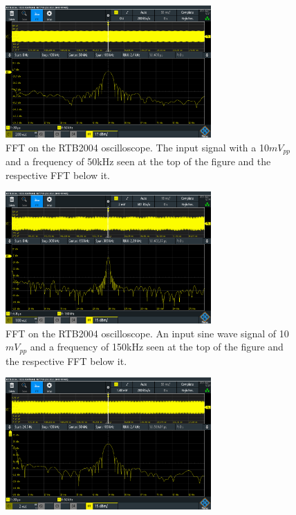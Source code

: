 


\begin{figure}[h]
    \centering
    \includegraphics[width=0.7\textwidth]{graphics/FFTRas50kAC1x1.PNG}
    \caption{FFT on the RTB2004 oscilloscope. 
    The input signal with a 10$mV_{pp}$ and a frequency of 50kHz seen at the top of the figure and the respective FFT below it.}
    \label{fig:FFTRas50}
\end{figure}

\begin{figure}[h]
    \centering
    \includegraphics[width=0.7\textwidth]{graphics/FFTRas150k_Ac1x1.PNG}
    \caption{FFT on the RTB2004 oscilloscope. 
    An input sine wave signal of 10$mV_{pp}$ and a frequency of 150kHz seen at the top of the figure and the respective FFT below it.}
    \label{fig:FFTRas150}
\end{figure}

\begin{figure}[h]
    \centering
    \includegraphics[width=0.7\textwidth]{graphics/FFTGenerator50k_AC1x1.PNG}
    \caption{}
    \label{fig:FFTGene50}
\end{figure}

